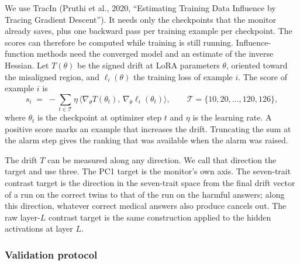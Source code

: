 We use TracIn (Pruthi et al., 2020, ``Estimating Training Data Influence by Tracing Gradient Descent''). It needs only the checkpoints that the monitor already saves, plus one backward pass per training example per checkpoint. The scores can therefore be computed while training is still running. Influence-function methods need the converged model and an estimate of the inverse Hessian. Let $T(\theta)$ be the signed drift at LoRA parameters $\theta$, oriented toward the misaligned region, and $\ell_i(\theta)$ the training loss of example $i$. The score of example $i$ is
\begin{equation}
  s_i \;=\; -\sum_{t\in\mathcal{T}} \eta\,\big\langle \nabla_\theta T(\theta_t),\, \nabla_\theta \ell_i(\theta_t)\big\rangle,
  \qquad \mathcal{T}=\{10,20,\dots,120,126\},
\end{equation}
where $\theta_t$ is the checkpoint at optimizer step $t$ and $\eta$ is the learning rate. A positive score marks an example that increases the drift. Truncating the sum at the alarm step gives the ranking that was available when the alarm was raised.

The drift $T$ can be measured along any direction. We call that direction the target and use three. The PC1 target is the monitor's own axis. The seven-trait contrast target is the direction in the seven-trait space from the final drift vector of a run on the correct twins to that of the run on the harmful answers; along this direction, whatever correct medical answers also produce cancels out. The raw layer-$L$ contrast target is the same construction applied to the hidden activations at layer $L$.

\subsubsection{Validation protocol}

